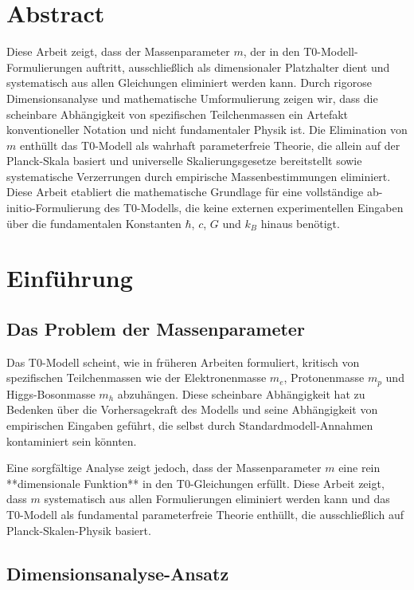 \section*{Abstract}
		Diese Arbeit zeigt, dass der Massenparameter $m$, der in den T0-Modell-Formulierungen auftritt, ausschließlich als dimensionaler Platzhalter dient und systematisch aus allen Gleichungen eliminiert werden kann. Durch rigorose Dimensionsanalyse und mathematische Umformulierung zeigen wir, dass die scheinbare Abhängigkeit von spezifischen Teilchenmassen ein Artefakt konventioneller Notation und nicht fundamentaler Physik ist. Die Elimination von $m$ enthüllt das T0-Modell als wahrhaft parameterfreie Theorie, die allein auf der Planck-Skala basiert und universelle Skalierungsgesetze bereitstellt sowie systematische Verzerrungen durch empirische Massenbestimmungen eliminiert. Diese Arbeit etabliert die mathematische Grundlage für eine vollständige ab-initio-Formulierung des T0-Modells, die keine externen experimentellen Eingaben über die fundamentalen Konstanten $\hbar$, $c$, $G$ und $k_B$ hinaus benötigt.

	
	
	\section{Einführung}
	\label{sec:introduction}
	
	\subsection{Das Problem der Massenparameter}
	\label{subsec:mass_problem}
	
	Das T0-Modell scheint, wie in früheren Arbeiten formuliert, kritisch von spezifischen Teilchenmassen wie der Elektronenmasse $m_e$, Protonenmasse $m_p$ und Higgs-Bosonmasse $m_h$ abzuhängen. Diese scheinbare Abhängigkeit hat zu Bedenken über die Vorhersagekraft des Modells und seine Abhängigkeit von empirischen Eingaben geführt, die selbst durch Standardmodell-Annahmen kontaminiert sein könnten.
	
	Eine sorgfältige Analyse zeigt jedoch, dass der Massenparameter $m$ eine rein **dimensionale Funktion** in den T0-Gleichungen erfüllt. Diese Arbeit zeigt, dass $m$ systematisch aus allen Formulierungen eliminiert werden kann und das T0-Modell als fundamental parameterfreie Theorie enthüllt, die ausschließlich auf Planck-Skalen-Physik basiert.
	
	\subsection{Dimensionsanalyse-Ansatz}
	\label{subsec:dimensional_approach}
	

